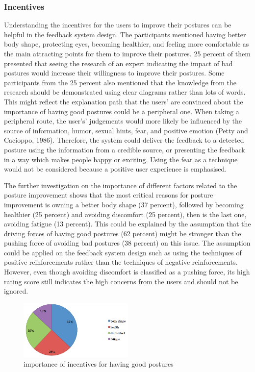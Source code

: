 \subsubsection{Incentives}
Understanding the incentives for the users to improve their postures can be helpful in the feedback system design. The participants mentioned having better body shape, protecting eyes, becoming healthier, and feeling more comfortable as the main attracting points for them to improve their postures. 25 percent of them presented that seeing the research of an expert indicating the impact of bad postures would increase their willingness to improve their postures. Some participants from the 25 percent also mentioned that the knowledge from the research should be demonstrated using clear diagrams rather than lots of words. This might reflect the explanation path that the users' are convinced about the importance of having good postures could be a peripheral one. When taking a peripheral route, the user's' judgements would more likely be influenced by the source of information, humor, sexual hints, fear, and positive emotion (Petty and Cacioppo, 1986). Therefore, the system could deliver the feedback to a detected posture using the information from a credible source, or presenting the feedback in a way which makes people happy or exciting. Using the fear as a technique would not be considered because a positive user experience is emphasised.

The further investigation on the importance of different factors related to the posture improvement shows that the most critical reasons for posture improvement is owning a better body shape (37 percent), followed by becoming healthier (25 percent) and avoiding discomfort (25 percent), then is the last one, avoiding fatigue (13 percent). This could be explained by the assumption that the driving forces of having good postures (62 percent) might be stronger than the pushing force of avoiding bad postures (38 percent) on this issue. The assumption could be applied on the feedback system design such as using the techniques of positive reinforcements rather than the techniques of negative reinforcements. However, even though avoiding discomfort is classified as a pushing force, its high rating score still indicates the high concerns from the users and should not be ignored.

\begin{figure}[h]
\centering
  \includegraphics[width=0.5\textwidth]{figs/importance}
\caption{importance of incentives for having good postures}
\end{figure}

